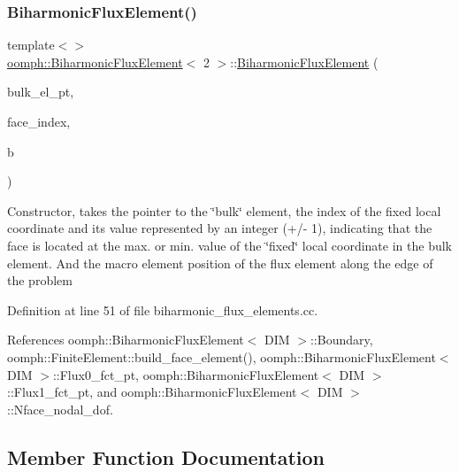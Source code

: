 \subsubsection{\texorpdfstring{Biharmonic\+Flux\+Element()}{BiharmonicFluxElement()}\hspace{0.1cm}{\footnotesize\ttfamily [4/4]}}
{\footnotesize\ttfamily template$<$$>$ \\
\hyperlink{classoomph_1_1BiharmonicFluxElement}{oomph\+::\+Biharmonic\+Flux\+Element}$<$ 2 $>$\+::\hyperlink{classoomph_1_1BiharmonicFluxElement}{Biharmonic\+Flux\+Element} (\begin{DoxyParamCaption}\item[{\hyperlink{classoomph_1_1FiniteElement}{Finite\+Element} $\ast$const \&}]{bulk\+\_\+el\+\_\+pt,  }\item[{const int \&}]{face\+\_\+index,  }\item[{const unsigned \&}]{b }\end{DoxyParamCaption})}

Constructor, takes the pointer to the \char`\"{}bulk\char`\"{} element, the index of the fixed local coordinate and its value represented by an integer (+/-\/ 1), indicating that the face is located at the max. or min. value of the \char`\"{}fixed\char`\"{} local coordinate in the bulk element. And the macro element position of the flux element along the edge of the problem 

Definition at line 51 of file biharmonic\+\_\+flux\+\_\+elements.\+cc.



References oomph\+::\+Biharmonic\+Flux\+Element$<$ D\+I\+M $>$\+::\+Boundary, oomph\+::\+Finite\+Element\+::build\+\_\+face\+\_\+element(), oomph\+::\+Biharmonic\+Flux\+Element$<$ D\+I\+M $>$\+::\+Flux0\+\_\+fct\+\_\+pt, oomph\+::\+Biharmonic\+Flux\+Element$<$ D\+I\+M $>$\+::\+Flux1\+\_\+fct\+\_\+pt, and oomph\+::\+Biharmonic\+Flux\+Element$<$ D\+I\+M $>$\+::\+Nface\+\_\+nodal\+\_\+dof.



\subsection{Member Function Documentation}
\mbox{\label{classoomph_1_1BiharmonicFluxElement_a91c948732fb3994a347faf3fd07e3875}} 
